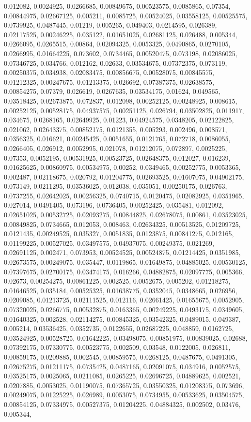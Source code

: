 0.012082, 0.0024925, 0.0266685, 0.00849675, 0.00523575, 0.0085865, 0.07354, 0.00844975, 0.02667125, 0.005211, 0.0085725, 0.00524025, 0.03558125, 0.00525575, 0.0739925, 0.0487445, 0.01219, 0.005265, 0.049403, 0.0214595, 0.026389, 0.02117525, 0.00246225, 0.035122, 0.01651025, 0.02681125, 0.026488, 0.005344, 0.0266095, 0.0265515, 0.00864, 0.02094325, 0.0053325, 0.0490865, 0.0270105, 0.0266995, 0.01664225, 0.073602, 0.0734465, 0.00520475, 0.073198, 0.02086025, 0.07346725, 0.034766, 0.012162, 0.02633, 0.03534675, 0.07372375, 0.073119, 0.00250375, 0.034938, 0.02083475, 0.00856675, 0.00528075, 0.00845575, 0.01212325, 0.00247675, 0.01213375, 0.026692, 0.07387375, 0.02638575, 0.00854275, 0.07379, 0.026619, 0.0267635, 0.03534175, 0.01624, 0.049565, 0.03518425, 0.02673875, 0.072837, 0.012098, 0.00252125, 0.00248925, 0.008615, 0.00252125, 0.00528175, 0.04937575, 0.00251125, 0.026794, 0.03502825, 0.011917, 0.034675, 0.0268165, 0.02649925, 0.01223, 0.04924575, 0.0348205, 0.02122825, 0.021062, 0.02643375, 0.00852175, 0.0121355, 0.005293, 0.002496, 0.008571, 0.0356325, 0.016621, 0.00245425, 0.0051655, 0.0121765, 0.072718, 0.0086055, 0.0266405, 0.026912, 0.0052995, 0.021078, 0.01212075, 0.072897, 0.0025225, 0.07353, 0.0052195, 0.00531925, 0.00523725, 0.02648375, 0.012027, 0.016239, 0.01625625, 0.00860975, 0.00534975, 0.00252, 0.0349465, 0.00252775, 0.0053365, 0.002487, 0.02118675, 0.020792, 0.01204775, 0.02693525, 0.01607075, 0.04902175, 0.073149, 0.0211295, 0.03536025, 0.012038, 0.035051, 0.00250175, 0.026763, 0.0737255, 0.02642025, 0.00256325, 0.0740715, 0.0120475, 0.02082925, 0.0351965, 0.027014, 0.0491405, 0.073196, 0.0736405, 0.00252425, 0.035481, 0.012092, 0.02651025, 0.00532725, 0.02093275, 0.00844825, 0.02678075, 0.00861, 0.03523025, 0.00849825, 0.0734665, 0.012053, 0.008463, 0.02634325, 0.00513525, 0.01209725, 0.0121435, 0.00249525, 0.035327, 0.0051835, 0.0123875, 0.00841275, 0.012165, 0.01199225, 0.00527025, 0.03497575, 0.04937075, 0.00249375, 0.021269, 0.02691125, 0.002471, 0.073953, 0.00524525, 0.00524875, 0.01214425, 0.0351985, 0.02673575, 0.00249075, 0.035447, 0.0119865, 0.01649875, 0.04885025, 0.00530125, 0.07397675, 0.02700175, 0.03474175, 0.016266, 0.04882875, 0.02097775, 0.005366, 0.02673, 0.00254275, 0.00861225, 0.002525, 0.0052675, 0.005202, 0.01218275, 0.01646525, 0.035184, 0.00525325, 0.01638775, 0.0352045, 0.0348665, 0.026956, 0.0209085, 0.01213725, 0.02111525, 0.012116, 0.02661425, 0.01655675, 0.0052905, 0.07320025, 0.0266775, 0.00532875, 0.0163365, 0.00249225, 0.0493175, 0.0349605, 0.01640325, 0.002528, 0.02114275, 0.00845325, 0.03542325, 0.0489015, 0.049387, 0.005214, 0.03536425, 0.0352735, 0.0122655, 0.02687225, 0.048859, 0.0162725, 0.03524925, 0.00528725, 0.01642225, 0.03498075, 0.00851975, 0.00839025, 0.02688, 0.07392175, 0.07330775, 0.00523775, 0.002509, 0.03548, 0.0122005, 0.026811, 0.00859175, 0.0209885, 0.002545, 0.00859575, 0.0268125, 0.0487675, 0.0491305, 0.02675275, 0.01211175, 0.0735425, 0.0487165, 0.02091075, 0.034916, 0.0052575, 0.03525175, 0.0025065, 0.0211085, 0.0265225, 0.02696725, 0.04889625, 0.002521, 0.0207885, 0.0053025, 0.01190075, 0.07365725, 0.03550325, 0.01208375, 0.073696, 0.00249075, 0.01225225, 0.026989, 0.0053075, 0.0734955, 0.00533625, 0.03504575, 0.00854125, 0.07334975, 0.00527375, 0.01204225, 0.04884325, 0.002502, 0.03476, 0.005344, 